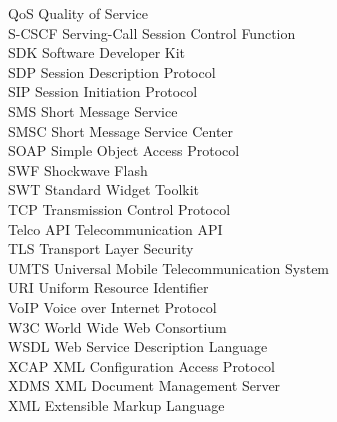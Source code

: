 \begin{tabbing}
QoS	 \> 	Quality of Service	 \\
S-CSCF	 \> 	Serving-Call Session Control Function	 \\
SDK	\>	Software Developer Kit \\
SDP	\>	Session Description Protocol \\
SIP	 \> 	Session Initiation Protocol	 \\
SMS	\>	Short Message Service \\
SMSC	\> Short Message Service Center \\
SOAP	 \> 	Simple Object Access Protocol	 \\
SWF	\>	Shockwave Flash \\
SWT	\>	Standard Widget Toolkit \\
TCP	 \> 	Transmission Control Protocol	 \\
Telco API	\>	Telecommunication API \\
TLS	\>	Transport Layer Security \\
UMTS	 \> 	Universal Mobile Telecommunication System	 \\
URI	 \> 	Uniform Resource Identifier	 \\
VoIP	 \> 	Voice over Internet Protocol	 \\
W3C	 \> 	World Wide Web Consortium	 \\
WSDL	\>	Web Service Description Language \\
XCAP	 \> 	XML Configuration Access Protocol	 \\
XDMS	 \> 	XML Document Management Server	 \\
XML	 \> 	Extensible Markup Language	 \\
\end{tabbing}
\endinput
